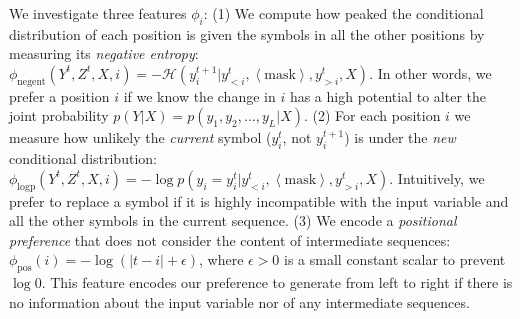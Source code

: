 \documentclass{article}
\begin{document}
We investigate three features $\phi_i$: %
(1) We compute how peaked the conditional distribution of each position is given the symbols in all the other positions by measuring its {\it negative entropy}:
    $\phi_{\text{negent}}(Y^t, Z^{t}, X, i) = 
    -
    \mathcal{H}(y^{t+1}_{i} | y^t_{<i}, \left< \text{mask} \right>, y^t_{>i}, X).$
In other words, we prefer a position $i$ if we know the change in $i$ has a high potential to alter the joint probability $p(Y|X) = p(y_1, y_2, ..., y_L|X)$.
(2) For each position $i$ we measure how unlikely the {\it current } symbol ($y^t_i$, not $y^{t+1}_i$) is under the {\it new} conditional distribution:
    $\phi_{\text{logp}}(Y^t, Z^t, X, i) = 
    -\log p(y_i=y^t_i | y^t_{<i}, \left< \text{mask} \right>, y^t_{>i}, X)$.
Intuitively, we prefer to replace a symbol if it is highly incompatible with the input variable and all the other symbols in the current sequence.
(3) We encode a {\it positional preference} that does not consider the content of intermediate sequences:
    $\phi_{\text{pos}}(i) = 
    - \log (| t - i |+\epsilon)$,
where $\epsilon > 0$ is a small constant scalar to prevent $\log 0$. This feature encodes our preference to generate from left to right if there is no information about 
the input variable nor of any intermediate sequences.

\end{document}

